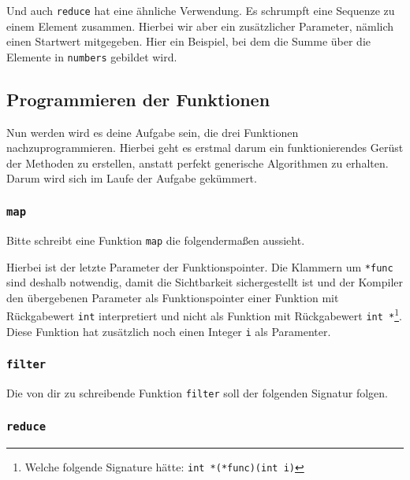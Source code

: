 

Und auch \lstinline{reduce} hat eine ähnliche Verwendung.
Es schrumpft eine Sequenze zu einem Element zusammen.
Hierbei wir aber ein zusätzlicher Parameter, nämlich einen Startwert mitgegeben.
Hier ein Beispiel, bei dem die Summe über die Elemente in \lstinline{numbers} gebildet wird.



\subsection{Programmieren der Funktionen}
\label{sec:map-filter-reduce-basic-impl}

Nun werden wird es deine Aufgabe sein, die drei Funktionen nachzuprogrammieren.
Hierbei geht es erstmal darum ein funktionierendes Gerüst der Methoden zu erstellen, anstatt perfekt generische Algorithmen zu erhalten.
Darum wird sich im Laufe der Aufgabe gekümmert.

\subsubsection{\lstinline{map}}

Bitte schreibt eine Funktion \lstinline{map} die folgendermaßen aussieht.



Hierbei ist der letzte Parameter der Funktionspointer.
Die Klammern um \lstinline{*func} sind deshalb notwendig, damit die Sichtbarkeit sichergestellt ist und der Kompiler den übergebenen Parameter als Funktionspointer einer Funktion mit Rückgabewert \lstinline{int} interpretiert und nicht als Funktion mit Rückgabewert \lstinline{int *}\footnote{Welche folgende Signature hätte: \lstinline{int *(*func)(int i)}}.
Diese Funktion hat zusätzlich noch einen Integer \lstinline{i} als Paramenter.

\subsubsection{\lstinline{filter}}

Die von dir zu schreibende Funktion \lstinline{filter} soll der folgenden Signatur folgen.



\subsubsection{\lstinline{reduce}}

